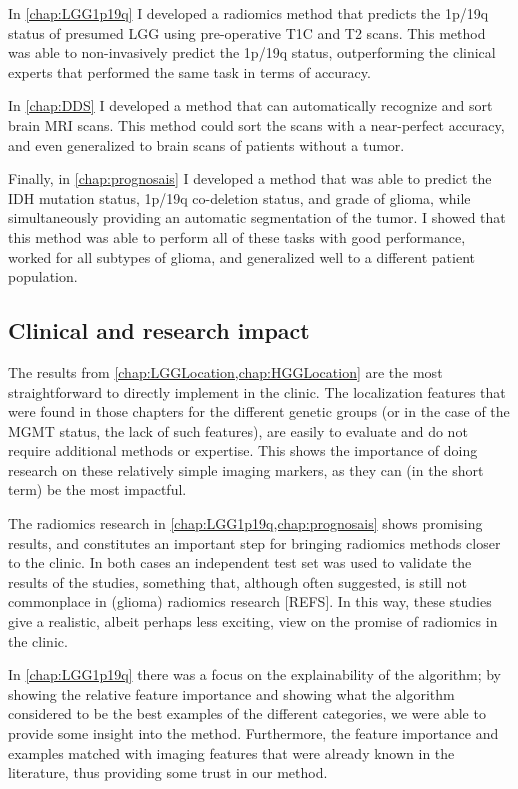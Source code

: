 In \cref{chap:LGG1p19q} I developed a radiomics method that predicts the 1p/19q status of presumed \gls{LGG} using pre-operative \gls{T1C} and \gls{T2} scans.
This method was able to non-invasively predict the 1p/19q status, outperforming the clinical experts that performed the same task in terms of accuracy.

In \cref{chap:DDS} I developed a method that can automatically recognize and sort brain \gls{MRI} scans.
This method could sort the scans with a near-perfect accuracy, and even generalized to brain scans of patients without a \gls{tumor}.

Finally, in \cref{chap:prognosais} I developed a method that was able to predict the \gls{IDH} mutation status, 1p/19q co-deletion status, and grade of glioma, while simultaneously providing an automatic segmentation of the \gls{tumor}.
I showed that this method was able to perform all of these tasks with good performance, worked for all subtypes of glioma, and generalized well to a different patient population.


\subsection{Clinical and research impact}

The results from \cref{chap:LGGLocation,chap:HGGLocation} are the most straightforward to directly implement in the clinic.
The localization features that were found in those chapters for the different genetic groups (or in the case of the \gls{MGMT} status, the lack of such features), are easily to evaluate and do not require additional methods or expertise.
This shows the importance of doing research on these relatively simple imaging markers, as they can (in the short term) be the most impactful.

The radiomics research in \cref{chap:LGG1p19q,chap:prognosais} shows promising results, and constitutes an important step for bringing radiomics methods closer to the clinic.
In both cases an independent test set was used to validate the results of the studies, something that, although often suggested, is still not commonplace in (glioma) radiomics research [REFS].
In this way, these studies give a realistic, albeit perhaps less exciting, view on the promise of radiomics in the clinic.

In \cref{chap:LGG1p19q} there was a focus on the explainability of the algorithm; by showing the relative feature importance and showing what the algorithm considered to be the best examples of the different categories, we were able to provide some insight into the method.
Furthermore, the feature importance and examples matched with imaging features that were already known in the literature, thus providing some trust in our method.

